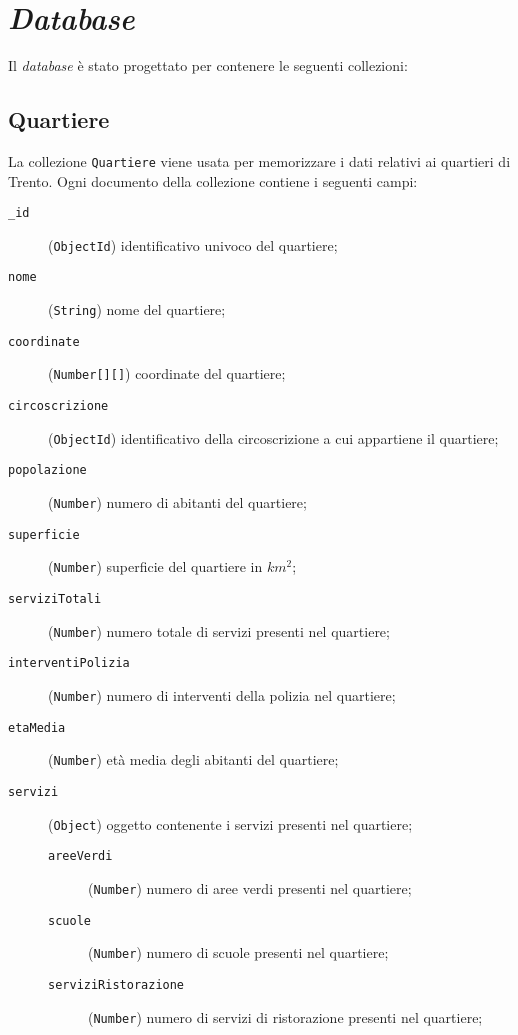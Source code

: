 \section{\textit{Database}}
    Il \textit{database} è stato progettato per contenere le seguenti collezioni:
    \subsection{Quartiere}
        La collezione \texttt{Quartiere} viene usata per memorizzare i dati relativi ai quartieri di Trento. Ogni documento della collezione contiene i seguenti campi:
        \begin{description}
            \item[\texttt{\_id}] (\texttt{ObjectId}) identificativo univoco del quartiere;
            \item[\texttt{nome}] (\texttt{String}) nome del quartiere;
            \item[\texttt{coordinate}] (\texttt{Number[][]}) coordinate del quartiere;
            \item[\texttt{circoscrizione}] (\texttt{ObjectId}) identificativo della circoscrizione a cui appartiene il quartiere;
            \item[\texttt{popolazione}] (\texttt{Number}) numero di abitanti del quartiere;
            \item[\texttt{superficie}] (\texttt{Number}) superficie del quartiere in $km^2$;
            \item[\texttt{serviziTotali}] (\texttt{Number}) numero totale di servizi presenti nel quartiere;
            \item[\texttt{interventiPolizia}] (\texttt{Number}) numero di interventi della polizia nel quartiere;
            \item[\texttt{etaMedia}] (\texttt{Number}) età media degli abitanti del quartiere;
            \item[\texttt{servizi}] (\texttt{Object}) oggetto contenente i servizi presenti nel quartiere;
                \begin{description}
                    \item[\texttt{areeVerdi}] (\texttt{Number}) numero di aree verdi presenti nel quartiere;
                    \item[\texttt{scuole}] (\texttt{Number}) numero di scuole presenti nel quartiere;
                    \item[\texttt{serviziRistorazione}] (\texttt{Number}) numero di servizi di ristorazione presenti nel quartiere;

\end{description}
\end{description}
